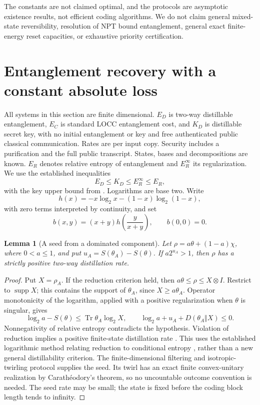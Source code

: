 \documentclass[11pt]{article}
\newtheorem{lemma}[theorem]{Lemma}
\newcommand{\Tr}{\operatorname{Tr}}
\begin{document}
The constants are not claimed optimal, and the protocols are asymptotic
existence results, not efficient coding algorithms. We do not claim
general mixed-state reversibility, resolution of NPT bound entanglement,
general exact finite-energy reset capacities, or exhaustive priority certification.

\section{Entanglement recovery with a constant absolute loss}\label{sec:recovery}
All systems in this section are finite dimensional. $E_D$ is two-way
distillable entanglement, $E_C$ is standard LOCC entanglement cost, and
$K_D$ is distillable secret key, with no initial entanglement or key and
free authenticated public classical communication. Rates are per input
copy. Security includes a purification and the full public transcript.
States, bases and decompositions are known. $E_R$ denotes relative
entropy of entanglement and $E_R^\infty$ its regularization.
We use the established inequalities
\[
 E_D\le K_D\le E_R^\infty\le E_R,
\]
with the key upper bound from \cite[Theorem 9]{hhho}.
Logarithms are base two. Write
\[
 h(x)=-x\log_2x-(1-x)\log_2(1-x),
\]
with zero terms interpreted by continuity, and set
\begin{equation}\label{eq:b}
 b(x,y)=(x+y)h\!\left(\frac{y}{x+y}\right),\qquad b(0,0)=0.
\end{equation}

\begin{lemma}[A seed from a dominated component]\label{lem:seed}
Let $\rho=a\theta+(1-a)\chi$, where $0<a\le1$, and put
$u_A=S(\theta_A)-S(\theta)$. If $a2^{u_A}>1$, then $\rho$ has
a strictly positive two-way distillation rate.
\end{lemma}
\begin{proof}
Put $X=\rho_A$. If the reduction criterion held, then
$a\theta\le\rho\le X\otimes I$. Restrict to $\operatorname{supp}X$;
this contains the support of $\theta_A$, since $X\ge a\theta_A$.
Operator monotonicity of the logarithm, applied with a positive
regularization when $\theta$ is singular, gives
\[
 \log_2a-S(\theta)\le\Tr\theta_A\log_2X,
 \qquad
 \log_2a+u_A+D(\theta_A\Vert X)\le0.
\]
Nonnegativity of relative entropy contradicts the hypothesis.
Violation of reduction implies a positive finite-state distillation
rate \cite[Section VI]{hh}. This uses the established logarithmic
method relating reduction to conditional entropy
\cite[Theorem 2, equations (21)--(24)]{vwentropy}, rather than a new
general distillability criterion. The finite-dimensional filtering and
isotropic-twirling protocol supplies the seed. Its twirl has an exact
finite convex-unitary realization by Carath\'eodory's theorem, so no
uncountable outcome convention is needed. The seed rate may be small;
the state is fixed before the coding block length tends to infinity.
\end{proof}
\end{document}
